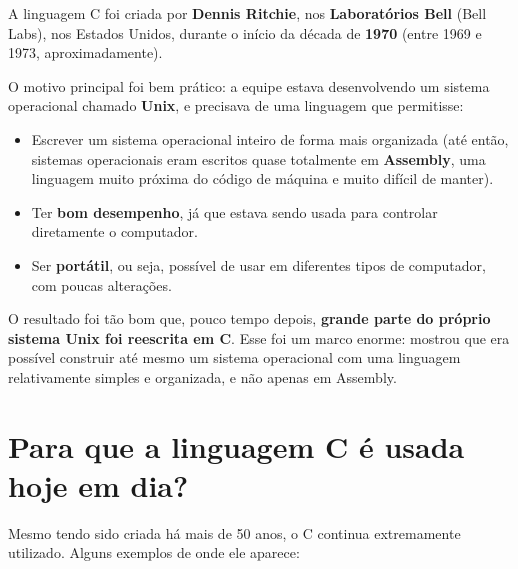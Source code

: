 A linguagem C foi criada por \textbf{\textcolor{laranja}{Dennis Ritchie}}, nos \textbf{Laboratórios Bell} (Bell Labs), nos Estados Unidos, durante o início da década de \textbf{1970} (entre 1969 e 1973, aproximadamente).

O motivo principal foi bem prático: a equipe estava desenvolvendo um sistema operacional chamado \textbf{Unix}, e precisava de uma linguagem que permitisse:

\begin{destacado}
\begin{itemize}
    \item Escrever um sistema operacional inteiro de forma mais organizada (até então, sistemas operacionais eram escritos quase totalmente em \textbf{Assembly}, uma linguagem muito próxima do código de máquina e muito difícil de manter).
    \item Ter \textbf{bom desempenho}, já que estava sendo usada para controlar diretamente o computador.
    \item Ser \textbf{portátil}, ou seja, possível de usar em diferentes tipos de computador, com poucas alterações.
\end{itemize}
\end{destacado}

O resultado foi tão bom que, pouco tempo depois, \textbf{grande parte do próprio sistema Unix foi reescrita em C}. Esse foi um marco enorme: mostrou que era possível construir até mesmo um sistema operacional com uma linguagem relativamente simples e organizada, e não apenas em Assembly.

\section{\textcolor{azulPrincipal}{Para que a linguagem C é usada hoje em dia?}}

Mesmo tendo sido criada há mais de 50 anos, o C continua extremamente utilizado. Alguns exemplos de onde ele aparece:


